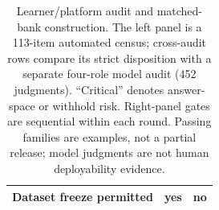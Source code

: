 \begin{table}[t]
\begin{minipage}[t]{.49\textwidth}
\begin{tabularx}{\linewidth}{@{}Xrrr@{}}
      Dataset freeze permitted & \multicolumn{2}{r}{yes} & no \\
      \bottomrule
    \end{tabularx}
  \end{minipage}
  \caption{Learner/platform audit and matched-bank construction.  The left
  panel is a 113-item automated census; cross-audit rows compare its strict
  disposition with a separate four-role model audit (452 judgments).
  ``Critical'' denotes answer-space or withhold risk.  Right-panel gates are
  sequential within each round.  Passing families are examples, not a partial
  release; model judgments are not human deployability evidence.}
  \label{tab:measurement-audit-bank}
\end{table}

